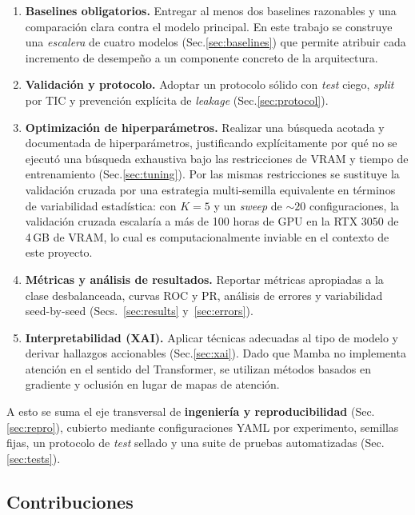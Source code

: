 \documentclass[11pt,a4paper]{article}
\begin{document}
\begin{enumerate}
  \item \textbf{Baselines obligatorios.} Entregar al menos dos baselines
    razonables y una comparación clara contra el modelo principal. En este
    trabajo se construye una \textit{escalera} de cuatro modelos
    (Sec.\ref{sec:baselines}) que permite atribuir cada incremento de
    desempeño a un componente concreto de la arquitectura.
  \item \textbf{Validación y protocolo.} Adoptar un protocolo sólido con
    \textit{test} ciego, \textit{split} por TIC y prevención explícita
    de \textit{leakage} (Sec.\ref{sec:protocol}).
  \item \textbf{Optimización de hiperparámetros.} Realizar una
    búsqueda acotada y documentada de hiperparámetros, justificando
    explícitamente por qué no se ejecutó una búsqueda exhaustiva
    bajo las restricciones de VRAM y tiempo de entrenamiento
    (Sec.\ref{sec:tuning}). Por las mismas restricciones se
    sustituye la validación cruzada por una estrategia multi-semilla
    equivalente en términos de variabilidad estadística: con $K=5$ y
    un \textit{sweep} de $\sim 20$ configuraciones, la validación
    cruzada escalaría a más de 100 horas de GPU en la RTX 3050 de
    4\,GB de VRAM, lo cual es computacionalmente inviable en el
    contexto de este proyecto.
  \item \textbf{Métricas y análisis de resultados.} Reportar métricas
    apropiadas a la clase desbalanceada, curvas ROC y PR, análisis de
    errores y variabilidad seed-by-seed (Secs.~\ref{sec:results}
    y~\ref{sec:errors}).
  \item \textbf{Interpretabilidad (XAI).} Aplicar técnicas adecuadas al
    tipo de modelo y derivar hallazgos accionables (Sec.\ref{sec:xai}).
    Dado que Mamba no implementa atención en el sentido del Transformer,
    se utilizan métodos basados en gradiente y oclusión en lugar de
    mapas de atención.
\end{enumerate}

A esto se suma el eje transversal de \textbf{ingeniería y
reproducibilidad} (Sec.\ref{sec:repro}), cubierto mediante configuraciones
YAML por experimento, semillas fijas, un protocolo de \textit{test} sellado
y una suite de pruebas automatizadas (Sec.\ref{sec:tests}).

\subsection{Contribuciones}
\label{subsec:contribuciones}
\end{document}
